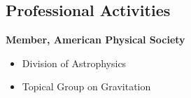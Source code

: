 \documentclass[margin,line]{res}
\begin{document}
\begin{resume}
\section{\sc Professional Activities}

{\bf Member, American Physical Society}
\vspace*{.05in}  
\begin{itemize}
\item Division of Astrophysics
\item Topical Group on Gravitation
\end{itemize}

\end{resume}
\end{document}
